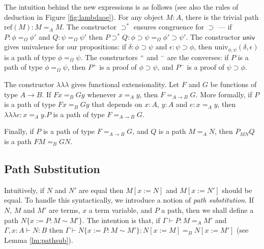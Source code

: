 \documentclass[a4paper,UKenglish]{lipics-v2016}
\newcommand*{\reff}[1]{\ensuremath{\mathrm{ref} \left( {#1} \right)}}
\newcommand*{\univ}[4]{\ensuremath{\mathrm{univ}_{{#1}, {#2}} \left({#3} , {#4} \right)}}
\newcommand*{\triplelambda}{\ensuremath{\lambda \!\! \lambda \!\! \lambda}}
\theoremstyle{plain}
\begin{document}
The intuition behind the new expressions is as follows (see also the rules of deduction in Figure \ref{fig:lambdaoe}).  For any object $M : A$, there is the trivial path $\reff{M} : M =_A M$.  The constructor $\supset^*$ ensures congruence for $\supset$ --- if $P : \phi =_\Omega \phi'$ and $Q : \psi =_\Omega \psi'$ then $P \supset^* Q : \phi \supset \psi =_\Omega \phi' \supset \psi'$.  The constructor $\mathsf{univ}$ gives univalence for our propositions: if $\delta : \phi \supset \psi$ and $\epsilon : \psi \supset \phi$, then $\univ{\phi}{\psi}{\delta}{\epsilon}$ is a path of type $\phi =_\Omega \psi$.  The constructors $^+$ and $^-$ are the converses: if $P$ is a path of type $\phi =_\Omega \psi$, then $P^+$ is a proof of $\phi \supset \psi$, and $P^-$ is a proof of $\psi \supset \phi$.

The constructor $\triplelambda$ gives functional extensionality.  Let $F$ and $G$ be functions of type $A \rightarrow B$.  If $F x =_B G y$ whenever $x =_A y$, then $F =_{A \rightarrow B} G$.  More formally, if $P$ is a path of type $Fx =_B Gy$ that depends on $x : A$, $y : A$ and $e : x =_A y$, then $\triplelambda e : x =_A y . P$ is a path of type $F =_{A \rightarrow B} G$.

Finally, if $P$ is a path of type $F =_{A \rightarrow B} G$, and $Q$ is a path $M =_A N$, then $P_{MN} Q$ is a path $FM =_B G N$.

\subsection{Path Substitution}

Intuitively, if $N$ and $N'$ are equal then $M[x:=N]$ and $M[x:=N']$ should be equal.  To handle this syntactically,
we introduce a notion of \emph{path substitution}.  If $N$, $M$ and $M'$ are terms, $x$ a term variable, and $P$ a path, then we shall define a path $N \{ x := P : M \sim M' \}$.  The intention is that, if
$\Gamma \vdash P : M =_A M'$ and $\Gamma, x : A \vdash N : B$ then $\Gamma \vdash N \{ x := P : M \sim M' \} : N [ x:= M ] =_B N [ x := M' ]$ (see Lemma \ref{lm:pathsub}). 
\end{document}
